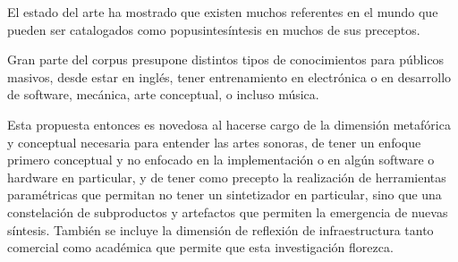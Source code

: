 \documentclass[../proyecto.tex]{subfiles}
\begin{document}
El estado del arte ha mostrado que existen muchos referentes en el mundo que pueden ser catalogados como popusintesíntesis en muchos de sus preceptos.

Gran parte del corpus presupone distintos tipos de conocimientos para públicos masivos, desde estar en inglés, tener entrenamiento en electrónica o en desarrollo de software, mecánica, arte conceptual, o incluso música.

Esta propuesta entonces es novedosa al hacerse cargo de la dimensión metafórica y conceptual necesaria para entender las artes sonoras, de tener un enfoque primero conceptual y no enfocado en la implementación o en algún software o hardware en particular, y de tener como precepto la realización de herramientas paramétricas que permitan no tener un sintetizador en particular, sino que una constelación de subproductos y artefactos que permiten la emergencia de nuevas síntesis. También se incluye la dimensión de reflexión de infraestructura tanto comercial como académica que permite que esta investigación florezca.
\end{document}
